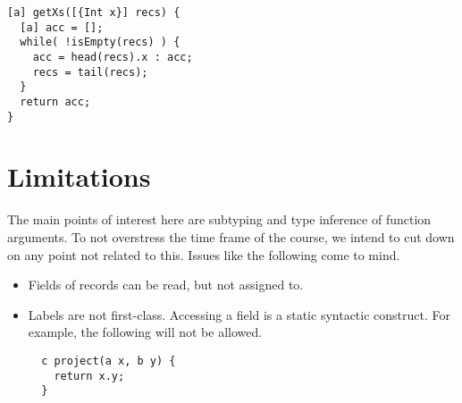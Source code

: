 \documentclass[a4paper]{article}
\begin{document}
\begin{verbatim}
[a] getXs([{Int x}] recs) {
  [a] acc = [];
  while( !isEmpty(recs) ) {
    acc = head(recs).x : acc;
    recs = tail(recs);
  }
  return acc;
}
\end{verbatim}

\section{Limitations}

The main points of interest here are subtyping and type inference of function
arguments.  To not overstress the time frame of the course, we intend to cut
down on any point not related to this.  Issues like the following come to mind.

\begin{itemize}

  \item Fields of records can be read, but not assigned to.

  \item Labels are not first-class.  Accessing a field is a static syntactic
  construct.  For example, the following will not be allowed.

  \begin{verbatim}
  c project(a x, b y) {
    return x.y;
  }
  \end{verbatim}

\end{itemize}



\end{document}
